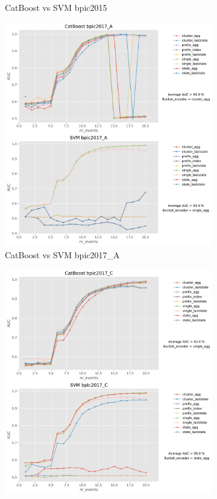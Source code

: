 \documentclass[twoside,11pt]{Latex/Classes/PhDthesisPSnPDF}
\begin{document}
\begin{figure}[t!]
\begin{subfigure}{0.48\textwidth}
		\caption{CatBoost vs SVM bpic2015} \label{fig:b151cs}
	\end{subfigure}
	
	\begin{subfigure}{0.48\textwidth}
		\includegraphics[width=\linewidth]{images/catboost/graphssvm/bpic2017_A_CatBoost_svm.pdf}
		\caption{CatBoost vs SVM bpic2017\_A} \label{fig:b17acs}
	\end{subfigure}\hspace*{\fill}
	\begin{subfigure}{0.48\textwidth}
		\includegraphics[width=\linewidth]{images/catboost/graphssvm/bpic2017_C_CatBoost_svm.pdf}

\end{subfigure}
\end{figure}
\end{document}
